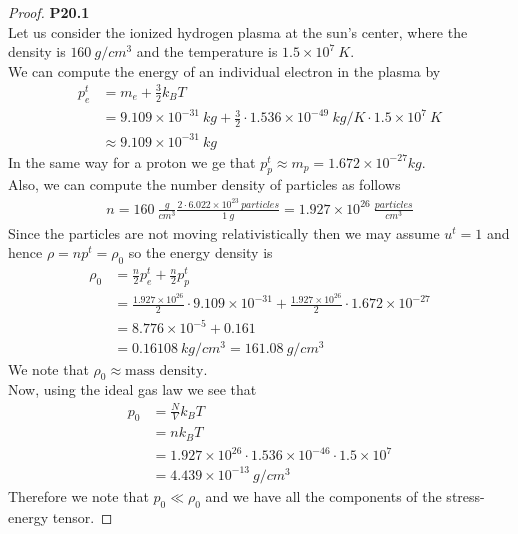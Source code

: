 \documentclass[11pt]{article}
\newcommand{\sci}[1]{\times 10^{#1}}
\theoremstyle{definition}
\begin{document}
\cleardoublepage
\begin{proof}{\textbf{P20.1}}\\
Let us consider the ionized hydrogen plasma at the sun's center, where the
density is $160~g/cm^3$ and the temperature is $1.5\sci{7}~K$.
\\
We can compute the energy of an individual electron in the plasma by
\begin{align*}
    p^t_e &= m_e + \frac{3}{2}k_B T\\
    &= 9.109\sci{-31}~kg + \frac{3}{2}\cdot 1.536\sci{-49}~kg/K \cdot 1.5\sci{7}~K\\
    &\approx 9.109\sci{-31}~kg
\end{align*}
In the same way for a proton we ge that $p^t_p \approx m_p = 1.672\sci{-27}{kg}$.
\\
Also, we can compute the number density of particles as follows
\begin{align*}
    n = 160~\frac{g}{cm^3} \frac{2 \cdot 6.022\sci{23}~particles}{1~g}
    = 1.927\sci{26}~\frac{particles}{cm^3}
\end{align*}
Since the particles are not moving relativistically then we may assume $u^t = 1$
and hence $\rho = n p^t = \rho_0$ so the energy density is
\begin{align*}
    \rho_0 &= \frac{n}{2} p^t_e + \frac{n}{2} p^t_p\\
    &= \frac{1.927\sci{26}}{2} \cdot 9.109\sci{-31}
    + \frac{1.927\sci{26}}{2} \cdot 1.672\sci{-27}\\
    &= 8.776\sci{-5} + 0.161\\
    &= 0.16108~kg/cm^3 = 161.08 ~g/cm^3
\end{align*}
We note that $\rho_0 \approx \text{mass density}$.
\\
Now, using the ideal gas law we see that
\begin{align*}
    p_0 &= \frac{N}{V} k_B T \\
    &= n k_B T\\
    &= 1.927\sci{26} \cdot 1.536\sci{-46} \cdot 1.5\sci{7}\\
    &= 4.439\sci{-13}~g/cm^3
\end{align*}
Therefore we note that $p_0 \ll \rho_0$ and we have all the components of the 
stress-energy tensor.
\end{proof}
\end{document}
